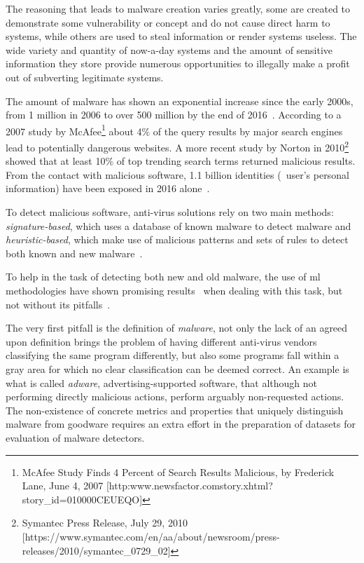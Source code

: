 The reasoning that leads to malware creation varies greatly, some are created to demonstrate some vulnerability or concept and do not cause direct harm to systems, while others are used to steal information or render systems useless.
The wide variety and quantity of now-a-day systems and the amount of sensitive information they store provide numerous opportunities to illegally make a profit out of subverting legitimate systems.

The amount of malware has shown an exponential increase since the early 2000s, from 1 million in 2006 to over 500 million by the end of 2016~\cite{av-test:report,mcafee:report}. According to a 2007 study by McAfee\footnote{McAfee Study Finds 4 Percent of Search Results Malicious, by Frederick Lane, June 4, 2007 [http:\/\/www.newsfactor.com\/story.xhtml?story\_id=010000CEUEQO]} about 4\% of the query results by major search engines lead to potentially dangerous websites. A more recent study by Norton in 2010\footnote{Symantec Press Release, July 29, 2010 [https://www.symantec.com/en/aa/about/newsroom/press-releases/2010/symantec\_0729\_02]} showed that at least 10\% of top trending search terms returned malicious results. From the contact with malicious software, 1.1 billion identities (\ie\ user's personal information) have been exposed in 2016 alone~\cite{symantec:report}.

To detect malicious software, anti-virus solutions rely on two main methods: \textit{signature-based}, which uses a database of known malware to detect malware and \textit{heuristic-based}, which make use of malicious patterns and sets of rules to detect both known and new malware~\cite{gryaznov:scanners}.

To help in the task of detecting both new and old malware, the use of \gls{ml} methodologies have shown promising results~\cite{arp2014drebin,christodorescu:semantics,kolosnjaji2016deep,kolter:learning,miller:rev_int,nissim:al_pdf,perdisci:behavior,rieck:dynamic,santos2013opcode,schultz:data_mining,schwenk2012autonomous,vsrndic2013detection} when dealing with this task, but not without its pitfalls~\cite{deo2016prescience,gandotra2014malware,jordaney2017transcend,rossow:practices}.

The very first pitfall is the definition of \textit{malware}, not only the lack of an agreed upon definition brings the problem of having different anti-virus vendors classifying the same program differently, but also some programs fall within a gray area for which no clear classification can be deemed correct.
An example is what is called \textit{adware}, advertising-supported software, that although not performing directly malicious actions, perform arguably non-requested actions.
The non-existence of concrete metrics and properties that uniquely distinguish malware from goodware requires an extra effort in the preparation of datasets for evaluation of malware detectors.

